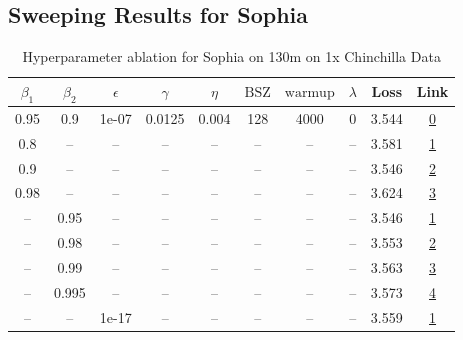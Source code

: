 \subsection{Sweeping Results for Sophia}%
\begin{table}[H]
\centering
\caption{Hyperparameter ablation for Sophia on 130m on 1x Chinchilla Data}
\label{tab:ablation_sophia_130m_on_1x_chinchilla_data}
\begin{tabular}{cccccccccc}
\toprule
$\beta_1$ & $\beta_2$ & $\epsilon$ & $\gamma$ & $\eta$ & $\mathrm{BSZ}$ & $\mathrm{warmup}$ & $\lambda$ & Loss & Link \\
\midrule
0.95 & 0.9 & 1e-07 & 0.0125 & 0.004 & 128 & 4000 & 0 & 3.544 & \href{https://wandb.ai/marin-community/optimizer-scaling/runs/sweep-130m-2B-sophiag67fd60lr0.004-wd0-minlr0-warmup4000-b10.95--7bdb33}{0} \\
\midrule
0.8 & -- & -- & -- & -- & -- & -- & -- & 3.581 & \href{https://wandb.ai/marin-community/optimizer-scaling/runs/sweep-130m-2B-sophiagf9d750lr0.004-wd0-minlr0-warmup4000-b10.8-b-1d728f}{1} \\
0.9 & -- & -- & -- & -- & -- & -- & -- & 3.546 & \href{https://wandb.ai/marin-community/optimizer-scaling/runs/sweep-130m-2B-sophiau81957flr0.004-wd0-minlr0-warmup4000-b10.9-b-743aad}{2} \\
0.98 & -- & -- & -- & -- & -- & -- & -- & 3.624 & \href{https://wandb.ai/marin-community/optimizer-scaling/runs/sweep-130m-2B-sophiagcf99e7lr0.004-wd0-minlr0-warmup4000-b10.98--b5b74a}{3} \\
-- & 0.95 & -- & -- & -- & -- & -- & -- & 3.546 & \href{https://wandb.ai/marin-community/optimizer-scaling/runs/sweep-130m-2B-sophiaud75557lr0.004-wd0-minlr0-warmup4000-b10.95--9bc769}{1} \\
-- & 0.98 & -- & -- & -- & -- & -- & -- & 3.553 & \href{https://wandb.ai/marin-community/optimizer-scaling/runs/sweep-130m-2B-sophiag5970d9lr0.004-wd0-minlr0-warmup4000-b10.95--d5a961}{2} \\
-- & 0.99 & -- & -- & -- & -- & -- & -- & 3.563 & \href{https://wandb.ai/marin-community/optimizer-scaling/runs/sweep-130m-2B-sophiagceaccflr0.004-wd0-minlr0-warmup4000-b10.95--4fb41c}{3} \\
-- & 0.995 & -- & -- & -- & -- & -- & -- & 3.573 & \href{https://wandb.ai/marin-community/optimizer-scaling/runs/sweep-130m-2B-sophiauf73bb0lr0.004-wd0-minlr0-warmup4000-b10.95--c36e04}{4} \\
-- & -- & 1e-17 & -- & -- & -- & -- & -- & 3.559 & \href{https://wandb.ai/marin-community/optimizer-scaling/runs/sweep-130m-2B-sophiag262464lr0.004-wd0-minlr0-warmup4000-b10.95--b0ffca}{1} \\

\end{tabular}
\end{table}
